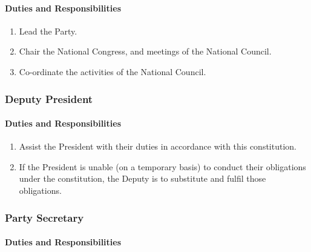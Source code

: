 \documentclass[a4paper,titlepage,8.5pt]{article}
\begin{document}
\paragraph{Duties and Responsibilities}

\begin{enumerate}
\item Lead the Party.
\item Chair the National Congress, and meetings of the National Council.
\item Co-ordinate the activities of the National Council.
\end{enumerate}

\subsubsection{Deputy President}

\paragraph{Duties and Responsibilities}

\begin{enumerate}
\item Assist the President with their duties in accordance with this constitution.
\item If the President is unable (on a temporary basis) to conduct their obligations under the constitution, the Deputy is to substitute and fulfil those obligations.
\end{enumerate}

\subsubsection{Party Secretary}

\paragraph{Duties and Responsibilities}
\end{document}
